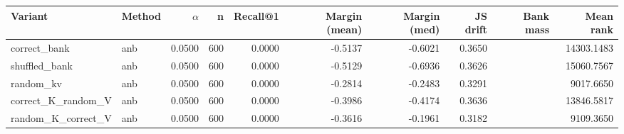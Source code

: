 \begin{tabular}{l l r r r r r r r r}
\toprule
Variant & Method & $\alpha$ & n & Recall@1 & Margin (mean) & Margin (med) & JS drift & Bank mass & Mean rank \\
\midrule
correct\_bank & anb & 0.0500 & 600 & 0.0000 & -0.5137 & -0.6021 & 0.3650 &  & 14303.1483 \\
shuffled\_bank & anb & 0.0500 & 600 & 0.0000 & -0.5129 & -0.6936 & 0.3626 &  & 15060.7567 \\
random\_kv & anb & 0.0500 & 600 & 0.0000 & -0.2814 & -0.2483 & 0.3291 &  & 9017.6650 \\
correct\_K\_random\_V & anb & 0.0500 & 600 & 0.0000 & -0.3986 & -0.4174 & 0.3636 &  & 13846.5817 \\
random\_K\_correct\_V & anb & 0.0500 & 600 & 0.0000 & -0.3616 & -0.1961 & 0.3182 &  & 9109.3650 \\
\bottomrule
\end{tabular}
